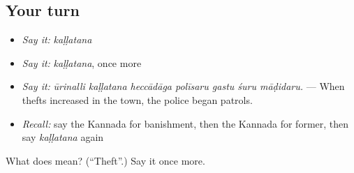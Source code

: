 \subsection*{Your turn}
\begin{itemize}
\raggedright
  \item \emph{Say it:} \emph{kaḷḷatana}
  \item \emph{Say it:} \emph{kaḷḷatana}, once more
  \item \emph{Say it:} \emph{ūrinalli kaḷḷatana heccādāga polīsaru gastu śuru māḍidaru.} — When thefts increased in the town, the police began patrols.
  \item \emph{Recall:} say the Kannada for banishment, then the Kannada for former, then say \emph{kaḷḷatana} again
\end{itemize}

\begin{tcolorbox}[breakable,colback=teal!4,colframe=teal!35!black,title={Before you move on}]
What does  mean? (\textquotedblleft{}Theft\textquotedblright{}.) Say it once more.
\end{tcolorbox}
